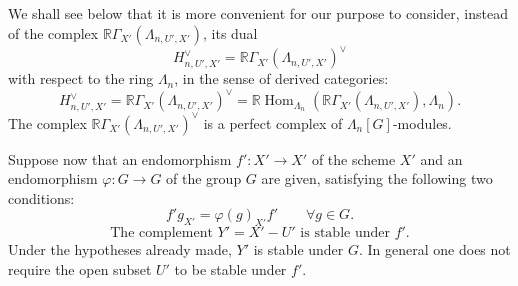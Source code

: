 \documentclass[11pt]{article}
\DeclareMathOperator{\Hom}{Hom}
\providecommand{\Hom}{\operatorname{Hom}}
\providecommand{\La}{\Lambda}
\providecommand{\Hom}{\operatorname{Hom}}
\begin{document}
We shall see below that it is more convenient for our purpose to consider, instead of the complex $\mathbb{R}\Gamma_{X'}(\La_{n,U',X'})$, its dual
\[
H_{n,U',X'}^\vee=\mathbb{R}\Gamma_{X'}(\La_{n,U',X'})^\vee
\]
with respect to the ring $\La_n$, in the sense of derived categories:
\[
H_{n,U',X'}^\vee
=\mathbb{R}\Gamma_{X'}(\La_{n,U',X'})^\vee
=\mathbb{R}\Hom_{\La_n}(\mathbb{R}\Gamma_{X'}(\La_{n,U',X'}),\La_n).
\]
The complex $\mathbb{R}\Gamma_{X'}(\La_{n,U',X'})^\vee$ is a perfect complex of $\La_n[G]$-modules.

Suppose now that an endomorphism $f':X'\to X'$ of the scheme $X'$ and an endomorphism $\varphi:G\to G$ of the group $G$ are given, satisfying the following two conditions:
\begin{equation}\tag{1.1}
f'g_{X'}=\varphi(g)_{X'}f'\qquad \forall g\in G .
\end{equation}
\begin{equation}\tag{1.2}
\text{The complement }Y'=X'-U'\text{ is stable under }f'.
\end{equation}
Under the hypotheses already made, $Y'$ is stable under $G$. In general one does not require the open subset $U'$ to be stable under $f'$.
\end{document}
